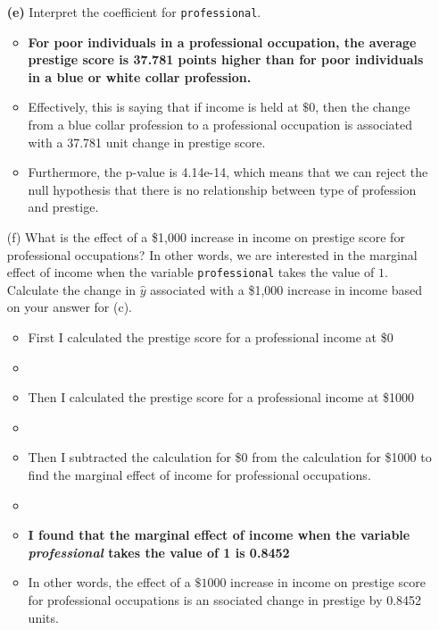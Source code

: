 \documentclass[12pt,letterpaper]{article}
\begin{document}
\begin{enumerate}
\textbf{(e)} Interpret the coefficient for \texttt{professional}.


\begin{itemize}
	\item \textbf{For poor individuals in a professional occupation, the average prestige score is 37.781 points higher than for poor individuals in a blue or white collar profession.}
	
	\item Effectively, this is saying that if income is held at $\$0$, then the change from a blue collar profession to a professional occupation is associated with a 37.781 unit change in prestige score.
	
	\item Furthermore, the p-value is 4.14e-14, which means that we can reject the null hypothesis that there is no relationship between type of profession and prestige.
\end{itemize}
	

	\item [(f)]
	What is the effect of a \$1,000 increase in income on prestige score for professional occupations? In other words, we are interested in the marginal effect of income when the variable \texttt{professional} takes the value of $1$. Calculate the change in $\hat{y}$ associated with a \$1,000 increase in income based on your answer for (c).
	
\begin{itemize}
	\item First I calculated the prestige score for a professional income at \$0
	\item 
	\item Then I calculated the prestige score for a professional income at \$1000
	\item 
	\item Then I subtracted the calculation for \$0 from the calculation for \$1000 to find the marginal effect of income for professional occupations.
	\item 
	\item \textbf{I found that the marginal effect of income when the variable \textit{professional} takes the value of 1 is 0.8452}
	\item In other words, the effect of a $\$1000$ increase in income on prestige score for professional occupations is an ssociated change in prestige by 0.8452 units.
\end{itemize}
	

\end{enumerate}
\end{document}
